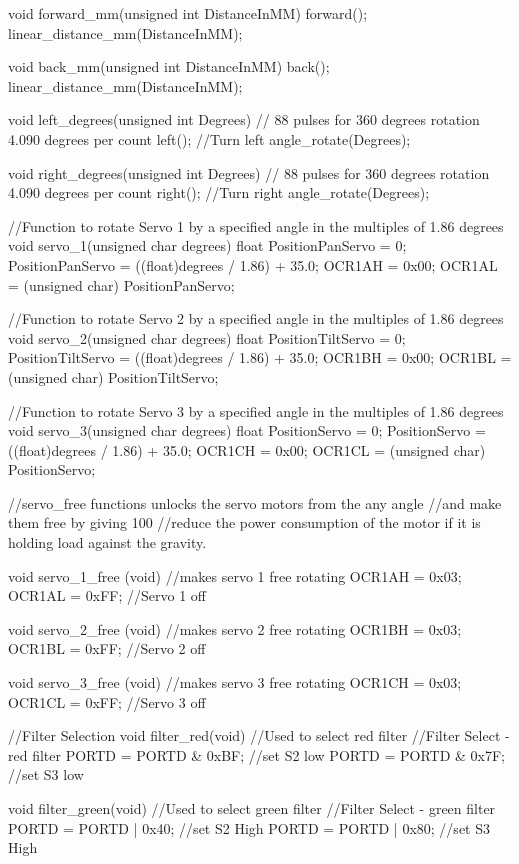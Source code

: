 void forward_mm(unsigned int DistanceInMM)
{
	forward();
	linear_distance_mm(DistanceInMM);
}

void back_mm(unsigned int DistanceInMM)
{
	back();
	linear_distance_mm(DistanceInMM);
}

void left_degrees(unsigned int Degrees)
{
	// 88 pulses for 360 degrees rotation 4.090 degrees per count
	left(); //Turn left
	angle_rotate(Degrees);
}


void right_degrees(unsigned int Degrees)
{
	// 88 pulses for 360 degrees rotation 4.090 degrees per count
	right(); //Turn right
	angle_rotate(Degrees);
}

//Function to rotate Servo 1 by a specified angle in the multiples of 1.86 degrees
void servo_1(unsigned char degrees)
{
	float PositionPanServo = 0;
	PositionPanServo = ((float)degrees / 1.86) + 35.0;
	OCR1AH = 0x00;
	OCR1AL = (unsigned char) PositionPanServo;
}


//Function to rotate Servo 2 by a specified angle in the multiples of 1.86 degrees
void servo_2(unsigned char degrees)
{
	float PositionTiltServo = 0;
	PositionTiltServo = ((float)degrees / 1.86) + 35.0;
	OCR1BH = 0x00;
	OCR1BL = (unsigned char) PositionTiltServo;
}

//Function to rotate Servo 3 by a specified angle in the multiples of 1.86 degrees
void servo_3(unsigned char degrees)
{
	float PositionServo = 0;
	PositionServo = ((float)degrees / 1.86) + 35.0;
	OCR1CH = 0x00;
	OCR1CL = (unsigned char) PositionServo;
}

//servo_free functions unlocks the servo motors from the any angle
//and make them free by giving 100%
//reduce the power consumption of the motor if it is holding load against the gravity.

void servo_1_free (void) //makes servo 1 free rotating
{
	OCR1AH = 0x03;
	OCR1AL = 0xFF; //Servo 1 off
}

void servo_2_free (void) //makes servo 2 free rotating
{
	OCR1BH = 0x03;
	OCR1BL = 0xFF; //Servo 2 off
}

void servo_3_free (void) //makes servo 3 free rotating
{
	OCR1CH = 0x03;
	OCR1CL = 0xFF; //Servo 3 off
}

//Filter Selection
void filter_red(void)    //Used to select red filter
{
	//Filter Select - red filter
	PORTD = PORTD & 0xBF; //set S2 low
	PORTD = PORTD & 0x7F; //set S3 low
}

void filter_green(void)	//Used to select green filter
{
	//Filter Select - green filter
	PORTD = PORTD | 0x40; //set S2 High
	PORTD = PORTD | 0x80; //set S3 High
}

